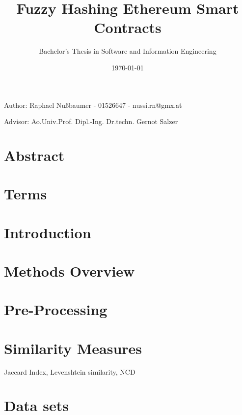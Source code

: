 \documentclass[]{article}
\title{Fuzzy Hashing Ethereum Smart Contracts}
\author{Bachelor's Thesis in Software and Information Engineering}
\date{\today}
\begin{document}
\maketitle
\begin{center}
  Author: Raphael Nußbaumer - 01526647 - nussi.rn@gmx.at

  Advisor: Ao.Univ.Prof. Dipl.-Ing. Dr.techn. Gernot Salzer
\end{center}

\section{Abstract}



\section{Terms}


\section{Introduction}


\section{Methods Overview}


\section{Pre-Processing}


\section{Similarity Measures}

Jaccard Index, Levenshtein similarity, NCD

\section{Data sets}

\end{document}
